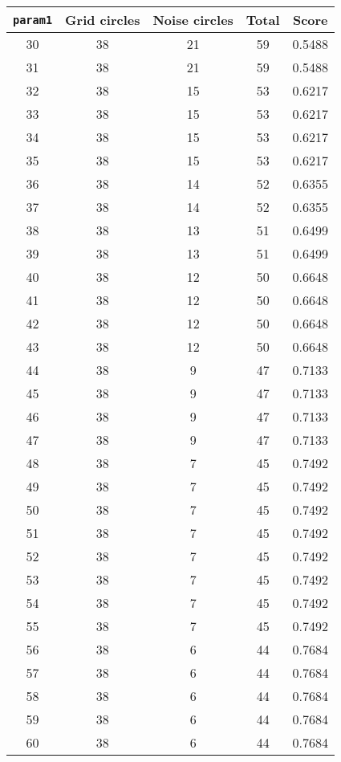 \documentclass[letterpaper, 12pt]{article}
\begin{document}
\begin{longtable}{|c|c|c|c|c|}
\hline
\textbf{\texttt{param1}} & \textbf{Grid circles} & \textbf{Noise circles} & \textbf{Total} & \textbf{Score} \\
\hline
30 & 38 & 21 & 59 & 0.5488 \\
\hline
31 & 38 & 21 & 59 & 0.5488 \\
\hline
32 & 38 & 15 & 53 & 0.6217 \\
\hline
33 & 38 & 15 & 53 & 0.6217 \\
\hline
34 & 38 & 15 & 53 & 0.6217 \\
\hline
35 & 38 & 15 & 53 & 0.6217 \\
\hline
36 & 38 & 14 & 52 & 0.6355 \\
\hline
37 & 38 & 14 & 52 & 0.6355 \\
\hline
38 & 38 & 13 & 51 & 0.6499 \\
\hline
39 & 38 & 13 & 51 & 0.6499 \\
\hline
40 & 38 & 12 & 50 & 0.6648 \\
\hline
41 & 38 & 12 & 50 & 0.6648 \\
\hline
42 & 38 & 12 & 50 & 0.6648 \\
\hline
43 & 38 & 12 & 50 & 0.6648 \\
\hline
44 & 38 & 9 & 47 & 0.7133 \\
\hline
45 & 38 & 9 & 47 & 0.7133 \\
\hline
46 & 38 & 9 & 47 & 0.7133 \\
\hline
47 & 38 & 9 & 47 & 0.7133 \\
\hline
48 & 38 & 7 & 45 & 0.7492 \\
\hline
49 & 38 & 7 & 45 & 0.7492 \\
\hline
50 & 38 & 7 & 45 & 0.7492 \\
\hline
51 & 38 & 7 & 45 & 0.7492 \\
\hline
52 & 38 & 7 & 45 & 0.7492 \\
\hline
53 & 38 & 7 & 45 & 0.7492 \\
\hline
54 & 38 & 7 & 45 & 0.7492 \\
\hline
55 & 38 & 7 & 45 & 0.7492 \\
\hline
56 & 38 & 6 & 44 & 0.7684 \\
\hline
57 & 38 & 6 & 44 & 0.7684 \\
\hline
58 & 38 & 6 & 44 & 0.7684 \\
\hline
59 & 38 & 6 & 44 & 0.7684 \\
\hline
60 & 38 & 6 & 44 & 0.7684 \\
\hline

\end{longtable}
\end{document}
